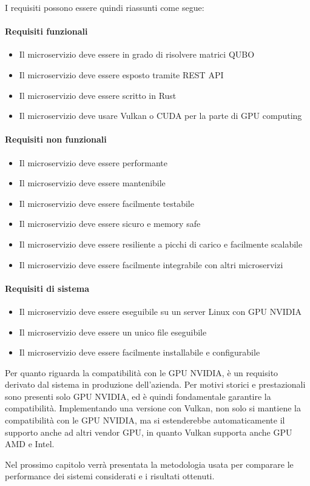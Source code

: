 I requisiti possono essere quindi riassunti come segue:

\paragraph{Requisiti funzionali}
\begin{itemize}
    \item Il microservizio deve essere in grado di risolvere matrici QUBO
    \item Il microservizio deve essere esposto tramite REST API
    \item Il microservizio deve essere scritto in Rust
    \item Il microservizio deve usare Vulkan o CUDA per la parte di GPU computing
\end{itemize}

\paragraph{Requisiti non funzionali}
\begin{itemize}
    \item Il microservizio deve essere performante
    \item Il microservizio deve essere mantenibile
    \item Il microservizio deve essere facilmente testabile
    \item Il microservizio deve essere sicuro e memory safe
    \item Il microservizio deve essere resiliente a picchi di carico e facilmente scalabile
    \item Il microservizio deve essere facilmente integrabile con altri microservizi
\end{itemize}

\paragraph{Requisiti di sistema}
\begin{itemize}
    \item Il microservizio deve essere eseguibile su un server Linux con GPU NVIDIA
    \item Il microservizio deve essere un unico file eseguibile
    \item Il microservizio deve essere facilmente installabile e configurabile
\end{itemize}

Per quanto riguarda la compatibilità con le GPU NVIDIA, è un requisito derivato dal sistema in produzione dell'azienda. Per motivi storici e prestazionali sono presenti solo GPU NVIDIA, ed è quindi fondamentale garantire la compatibilità. Implementando una versione con Vulkan, non solo si mantiene la compatibilità con le GPU NVIDIA, ma si estenderebbe automaticamente il supporto anche ad altri vendor GPU, in quanto Vulkan supporta anche GPU AMD e Intel.

Nel prossimo capitolo verrà presentata la metodologia usata per comparare le performance dei sistemi considerati e i risultati ottenuti.

